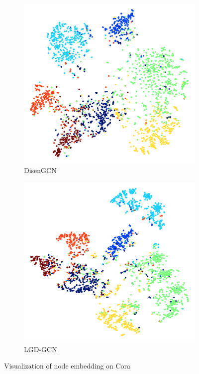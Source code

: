 \documentclass[accepted]{uai2021} %
\begin{document}
\begin{figure}[ht]
    \begin{subfigure}[b]{0.23\textwidth}
         \centering
         \includegraphics[width=.85\textwidth]{disengcn_coravisual.png}
         \caption{DisenGCN}
         \label{fig:cora_disengcn}
    \end{subfigure}
    \hfill
    \begin{subfigure}[b]{0.23\textwidth}
         \centering
         \includegraphics[width=.85\textwidth]{lgd_coravisual.png}
         \caption{LGD-GCN}
         \label{fig:cora_lgd}
    \end{subfigure}
    \caption{Visualization of node embedding on Cora}
    \label{fig:CoraVisual}
\end{figure}
\end{document}
